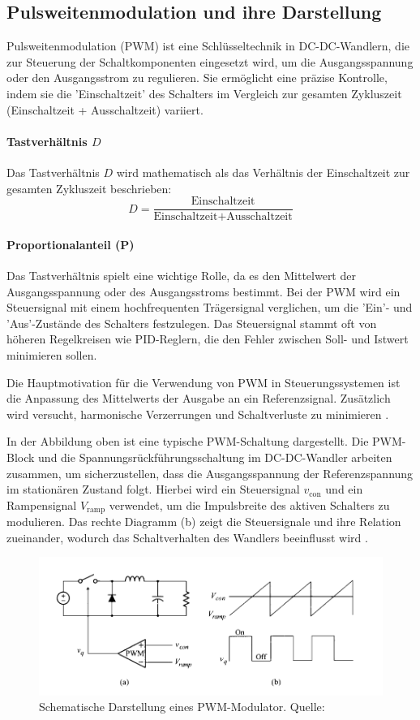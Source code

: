 

\subsection{Pulsweitenmodulation und ihre Darstellung}
Pulsweitenmodulation (PWM) ist eine Schlüsseltechnik in DC-DC-Wandlern, die zur Steuerung der Schaltkomponenten eingesetzt wird, um die Ausgangsspannung oder den Ausgangsstrom zu regulieren. Sie ermöglicht eine präzise Kontrolle, indem sie die 'Einschaltzeit' des Schalters im Vergleich zur gesamten Zykluszeit (Einschaltzeit + Ausschaltzeit) variiert.\cite[p.~2]{peddapelli2017pulse}

\paragraph{Tastverhältnis \(D\)}
Das Tastverhältnis \( D \) wird mathematisch als das Verhältnis der Einschaltzeit zur gesamten Zykluszeit beschrieben:
\begin{equation}
D = \frac{\text{Einschaltzeit}}{\text{Einschaltzeit} + \text{Ausschaltzeit}}
\end{equation}

\paragraph{Proportionalanteil (P)}
Das Tastverhältnis spielt eine wichtige Rolle, da es den Mittelwert der Ausgangsspannung oder des Ausgangsstroms bestimmt. Bei der PWM wird ein Steuersignal mit einem hochfrequenten Trägersignal verglichen, um die 'Ein'- und 'Aus'-Zustände des Schalters festzulegen. Das Steuersignal stammt oft von höheren Regelkreisen wie PID-Reglern, die den Fehler zwischen Soll- und Istwert minimieren sollen.

Die Hauptmotivation für die Verwendung von PWM in Steuerungssystemen ist die Anpassung des Mittelwerts der Ausgabe an ein Referenzsignal. Zusätzlich wird versucht, harmonische Verzerrungen und Schaltverluste zu minimieren \cite[p.~2]{peddapelli2017pulse}.

In der Abbildung oben ist eine typische PWM-Schaltung dargestellt. Die PWM-Block und die Spannungsrückführungsschaltung im DC-DC-Wandler arbeiten zusammen, um sicherzustellen, dass die Ausgangsspannung der Referenzspannung im stationären Zustand folgt. Hierbei wird ein Steuersignal \(v_{\text{con}}\) und ein Rampensignal \(V_{\text{ramp}}\) verwendet, um die Impulsbreite des aktiven Schalters zu modulieren. Das rechte Diagramm (b) zeigt die Steuersignale und ihre Relation zueinander, wodurch das Schaltverhalten des Wandlers beeinflusst wird \cite[p.~114]{choi2013pulsewidth}.



\begin{figure}[htbp]
    \centering
    \includegraphics[width=0.8\linewidth]{2Grundlagen/141PWM.png}
    \caption{Schematische Darstellung eines PWM-Modulator. Quelle: \cite[p.~114]{choi2013pulsewidth}}
    \label{fig:dcdc_converter}
\end{figure}
